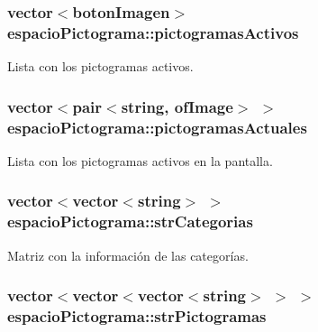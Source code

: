 \subsubsection[{pictogramas\+Activos}]{\setlength{\rightskip}{0pt plus 5cm}vector$<${\bf boton\+Imagen}$>$ espacio\+Pictograma\+::pictogramas\+Activos\hspace{0.3cm}{\ttfamily [private]}}\label{classespacio_pictograma_a7c0a60d23d55abbc5bb131fadf0210d4}


Lista con los pictogramas activos. 

\hypertarget{classespacio_pictograma_a46e6758b5312fa89401ff012aa2d2b92}{}
\subsubsection[{pictogramas\+Actuales}]{\setlength{\rightskip}{0pt plus 5cm}vector$<$pair$<$string, of\+Image$>$ $>$ espacio\+Pictograma\+::pictogramas\+Actuales\hspace{0.3cm}{\ttfamily [private]}}\label{classespacio_pictograma_a46e6758b5312fa89401ff012aa2d2b92}


Lista con los pictogramas activos en la pantalla. 

\hypertarget{classespacio_pictograma_a90f13e054faabc1dc26f9e62fff6f572}{}
\subsubsection[{str\+Categorias}]{\setlength{\rightskip}{0pt plus 5cm}vector$<$vector$<$string$>$ $>$ espacio\+Pictograma\+::str\+Categorias\hspace{0.3cm}{\ttfamily [private]}}\label{classespacio_pictograma_a90f13e054faabc1dc26f9e62fff6f572}


Matriz con la información de las categorías. 

\hypertarget{classespacio_pictograma_af241bdf93ef686631b46fdadf07da04a}{}
\subsubsection[{str\+Pictogramas}]{\setlength{\rightskip}{0pt plus 5cm}vector$<$vector$<$vector$<$string$>$ $>$ $>$ espacio\+Pictograma\+::str\+Pictogramas\hspace{0.3cm}{\ttfamily [private]}}\label{classespacio_pictograma_af241bdf93ef686631b46fdadf07da04a}


